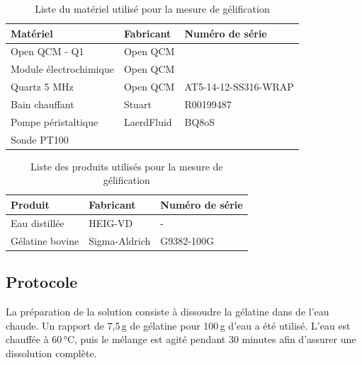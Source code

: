\begin{table}[H]
    \centering
    \begin{tabular}{|l|l|l|}
        \hline
        \textbf{Matériel}         & \textbf{Fabricant}   & \textbf{Numéro de série} \\
        \hline
        Open QCM - Q1             & Open QCM              &   \\
        Module électrochimique    & Open QCM              &   \\
        Quartz 5 MHz             & Open QCM              &   AT5-14-12-SS316-WRAP\\
        Bain chauffant            & Stuart                &  R00199487 \\
        Pompe péristaltique       & LaerdFluid            &  BQ8oS \\
        Sonde PT100               &                       &   \\
        \hline
    \end{tabular}
    \caption{Liste du matériel utilisé pour la mesure de gélification}
    \label{tab:materielGelification}
\end{table}

\begin{table}[H]
    \centering
    \begin{tabular}{|l|l|l|}
        \hline
        \textbf{Produit} & \textbf{Fabricant}   & \textbf{Numéro de série} \\
        \hline
        Eau distillée    & HEIG-VD              &   -           \\
        Gélatine bovine  & Sigma-Aldrich        &   G9382-100G  \\
        \hline
    \end{tabular}
    \caption{Liste des produits utilisés pour la mesure de gélification}
\end{table}

\subsection{Protocole}


La préparation de la solution consiste à dissoudre la gélatine dans de l’eau chaude. Un rapport de 7,5 g de gélatine pour 100 g d’eau a été utilisé. L’eau est chauffée à 60 °C, puis le mélange est agité pendant 30 minutes afin d’assurer une dissolution complète.

